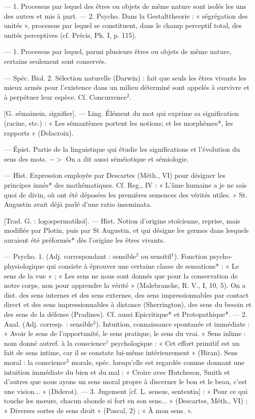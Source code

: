 \begin{itemize}[leftmargin=1cm, label=, itemsep=1pt]
 — 1. Processus par lequel
des êtres ou objets de même nature
sont isolés les uns des autres et mis
à part. — 2. Psycho. Dans la Gestalttheorie : « ségrégation des unités »,
processus par lequel se constituent,
dans le champ perceptif total,
des unités perceptives (cf. Précis,
Ph. I, p. 115).

 — 1. Processus par lequel,
parmi plusieurs êtres ou objets de
même nature, certains seulement
sont conservés.

— Spéc. Biol. 2. Sélection naturelle (Darwin) : fait que seuls les
êtres vivants les mieux armés pour
l'existence dans un milieu déterminé sont appelés à survivre et à perpétuer leur espèce. Cf. Concurrence$^2$.

 [G. sêmainein, signifier]. —
Ling. Élément du mot qui exprime
sa signification (racine, etc.) : « Les
sémantèmes portent les notions; et
les morphèmes*, les rapports »
(Delacroix).

 — Épist. Partie de la
linguistique qui étudie les significations et l'évolution du sens des mots.
$->$ On a dit aussi séméiotique et
sémiologie.

 — Hist. Expression employée par Descartes (Méth.,
VI) pour désigner les principes
innés* des mathématiques. Cf. Reg.,
IV : « L'âme humaine a je ne sais
quoi de divin, où ont été déposées
les premières semences des vérités
utiles. » St. Augustin avait déjà
parlé d’une ratio inseminata.

 [Trad. G. : logospermatikoï]. — Hist. Notion d’origine stoïcienne, reprise, mais modifiée par Plotin, puis par St Augustin, et qui désigne les germes dans
lesquels auraient été préformés* dès
l’origine les êtres vivants.

 — Psycho. 1. (Adj. correspondant : sensible$^2$ ou sensitif$^1$). Fonction psycho-physiologique qui consiste à éprouver une certaine classe
de sensations* : « Le sens de la vue » ;
« Les sens ne nous sont donnés que
pour la conservation de notre corps,
non pour apprendre la vérité » (Malebranche, R. V., I, 10, 5). On a dist.
des sens internes et des sens externes,
des sens impressionnables par contact direct et des sens impressionnables à distance (Sherrington), des
sens du besoin et des sens de la
défense (Pradines). Cf. aussi Epicritique* et Protopathique*. — 2.
Anal. (Adj. corresp. : sensible$^3$).
Intuition, connaissance spontanée
et immédiate : « Avoir le sens de
l'opportunité, le sens pratique, le
sens du vrai. » Sens inlime : nom
donné autref. à la conscience$^1$ psychologique :
« Cet effort primitif est
un fait de sens intime, car il se
constate lui-même intérieurement »
(Biran). Sens moral : la conscience$^3$
morale, spéc. lorsqu'elle est regardée
comme donnant une intuition immédiate du bien et du mal : « Croire
avec Hutcheson, Smith et d'autres
que nous ayons un sens moral
propre à discerner le bon et le beau,
c'est une vision... » (Diderot). —
3. Jugement [cf. L. sensus, sententia] : « Pour ce qui touche les
mœurs, chacun abonde si fort en
son sens... » (Descartes, Méth., VI) ;
« Diverses sortes de sens droit »
(Pascal, 2) ; « À mon sens. ».


\end{itemize}
